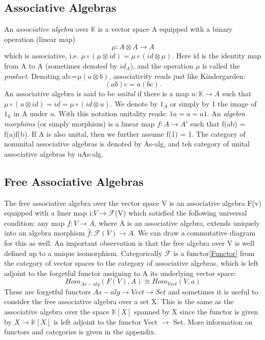 \documentclass[preprint, 5p, 10pt]{elsarticle}
\theoremstyle{plain}
\begin{document}
\subsection{Associative Algebras}
An \emph{associative algebra} over $\mathbb{K}$ is a vector space A equipped with a binary operation
(linear map)
\begin{displaymath}
 \mu:A \otimes A \rightarrow A
\end{displaymath}
which is associative, i.e. $\mu \circ(\mu \otimes id) = \mu \circ (id \otimes \mu).$
Here id is the identity map from A to A (sometimes denoted by $id_{A}$), and the operation $\mu$
is called the \emph{product}. Denoting ab:=$\mu(a \otimes b)$, associativity reads just like Kindergarden:
\begin{displaymath}
 (ab)c = a(bc).
\end{displaymath}
An associative algebra is said to be \emph{unital} if there is a map $u:\mathbb{K} \rightarrow A$
such that $\mu \circ (u \otimes id) = id = \mu \circ (id \otimes u).$ We denote by $1_{A}$ or simply
by 1 the image of $1_{\mathbb{K}}$ in A under $u$. With this notation unitality reads:
$1a = a = a1.$
An \emph{algebra morphims} (or simply morphism) is a linear map $f:A \rightarrow A'$ such that f(ab) = f(a)f(b).
If A is also unital, then we further assume f(1) = 1.
\phantom{xxx}The category of nonunital associative algebras is denoted by As-alg, and teh category of unital
associative algebras by uAs-alg. 
\subsection{Free Associative Algebras}\cite{AlgebraicOperads}
The free associative algebra over the vector space V is an associative algebra F(v) equipped with a 
liner map i:$V \rightarrow \mathcal{F}$(V) which satisfied the following universal condition:
any map $f:V\rightarrow A$, where A is an associative algebra, extends uniquely into an algebra morphism
$\hat{f}:\mathcal{F}(V)\rightarrow A$. We can draw a commutative diagram for this as well. 
An important observation is that the free algebra over V is well defined up to a unique isomorphism.
Categorically $\mathcal{F}$ is a functor\ref{Functor} from the category of vector spaces to the category of associative 
algebras, which is left adjoint to the forgetful functor assigning to A its underlying vector space:
\begin{displaymath}
 Hom_{As-alg}(F(V),A) \cong Hom_{Vect}(V,a)
\end{displaymath}
These are forgetful functors $As-alg \rightarrow Vect \rightarrow Set$ and sometimes it is useful
to consider the free associative algebra over a set X. This is the same as the associative algebra over the space $
\mathbb{K}[X]$ spanned by X since the functor is given by $X \rightarrow \mathbb{K}[X]$ is left adjoint to
the functor Vect $\rightarrow$ Set. More information on functors and categories is given in the appendix.
\end{document}
